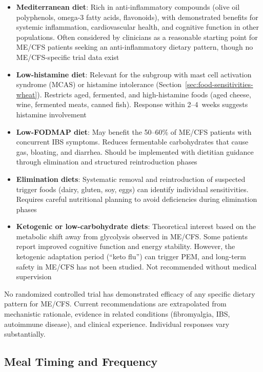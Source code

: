\begin{itemize}
    \item \textbf{Mediterranean diet}: Rich in anti-inflammatory compounds (olive oil polyphenols, omega-3 fatty acids, flavonoids), with demonstrated benefits for systemic inflammation, cardiovascular health, and cognitive function in other populations. Often considered by clinicians as a reasonable starting point for ME/CFS patients seeking an anti-inflammatory dietary pattern, though no ME/CFS-specific trial data exist
    \item \textbf{Low-histamine diet}: Relevant for the subgroup with mast cell activation syndrome (MCAS) or histamine intolerance (Section~\ref{sec:food-sensitivities-wheat}). Restricts aged, fermented, and high-histamine foods (aged cheese, wine, fermented meats, canned fish). Response within 2--4~weeks suggests histamine involvement
    \item \textbf{Low-FODMAP diet}: May benefit the 50--60\% of ME/CFS patients with concurrent IBS symptoms. Reduces fermentable carbohydrates that cause gas, bloating, and diarrhea. Should be implemented with dietitian guidance through elimination and structured reintroduction phases
    \item \textbf{Elimination diets}: Systematic removal and reintroduction of suspected trigger foods (dairy, gluten, soy, eggs) can identify individual sensitivities. Requires careful nutritional planning to avoid deficiencies during elimination phases
    \item \textbf{Ketogenic or low-carbohydrate diets}: Theoretical interest based on the metabolic shift away from glycolysis observed in ME/CFS. Some patients report improved cognitive function and energy stability. However, the ketogenic adaptation period (``keto flu'') can trigger PEM, and long-term safety in ME/CFS has not been studied. Not recommended without medical supervision
\end{itemize}

\begin{limitation}
No randomized controlled trial has demonstrated efficacy of any specific dietary pattern for ME/CFS. Current recommendations are extrapolated from mechanistic rationale, evidence in related conditions (fibromyalgia, IBS, autoimmune disease), and clinical experience. Individual responses vary substantially.
\end{limitation}

\subsection{Meal Timing and Frequency}

